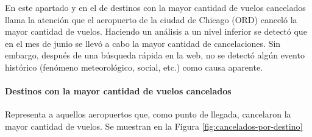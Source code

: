 \documentclass[12pt]{article}
\numberwithin{equation}{section}
\numberwithin{table}{section}
\numberwithin{figure}{section}
\begin{document}
En este apartado y en el de destinos con la mayor cantidad de vuelos cancelados llama la atención que el aeropuerto de la ciudad de Chicago (ORD) canceló la mayor cantidad de vuelos.
Haciendo un análisis a un nivel inferior se detectó que en el mes de junio se llevó a cabo la mayor cantidad de cancelaciones. Sin embargo, después de una búsqueda rápida en la web, no se detectó algún evento histórico (fenómeno meteorológico, social, etc.) como causa aparente.

\paragraph{Destinos con la mayor cantidad de vuelos cancelados}
Representa a aquellos aeropuertos que, como punto de llegada, cancelaron la mayor cantidad de vuelos. Se muestran en la Figura \ref{fig:cancelados-por-destino} 
\end{document}
